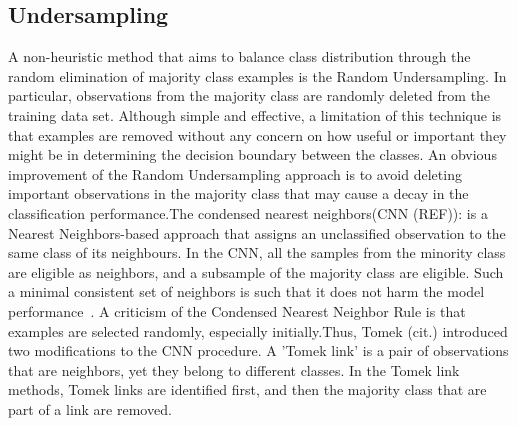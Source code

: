\subsection{Undersampling}

A non-heuristic method that aims to balance class distribution through the random elimination of majority class examples is the Random Undersampling. In particular,
observations from the majority class are randomly deleted from the training data set. Although simple and effective, a limitation of this technique is that examples are removed without any concern on how useful or important they might be in determining the decision boundary between the classes.
An obvious improvement of the Random Undersampling approach is to avoid deleting important observations in the majority class that may cause a decay in the classification performance.The condensed nearest neighbors(CNN (REF)): is a Nearest Neighbors-based approach that assigns an unclassified observation to the same class of its neighbours. In the CNN, all the samples from the minority class are eligible as neighbors, and a subsample of the majority class are eligible. Such a minimal consistent set of neighbors is such that it does not harm the model performance~\cite{gowda1979condensed}. A criticism of the Condensed Nearest Neighbor Rule is that examples are selected randomly, especially initially.Thus, Tomek (cit.) introduced two modifications to the CNN procedure. 
A 'Tomek link' is a pair of observations that  are neighbors, yet they belong to different classes. In the Tomek link methods,  Tomek links are identified first, and then the majority class that are part of a link are removed.\\

